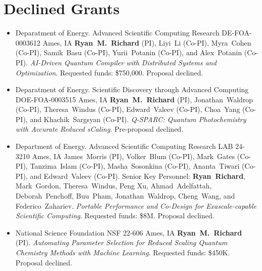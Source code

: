 \section{Declined Grants}
\begin{itemize}
	\item{
	      {Deparatment of Energy. Advanced Scientific Computing Research}
		  {DE-FOA-0003612}
		  {Ames, IA}
		  {}
		  {\textbf{Ryan~M.~Richard} (PI), Liyi~Li (Co-PI), Myra~Cohen (Co-PI), 
		   Samik~Basu (Co-PI), Yurii~Potanin (Co-PI), and Alex~Potanin (Co-PI).
		   \textit{AI-Driven Quantum Compiler with Distributed Systems and 
		           Optimization}.
		   Requested funds: \$750,000. Proposal declined.}
	}
	\item{
	      {Deparatment of Energy. Scientific Discovery through Advanced
		   Computing}
		  {DOE-FOA-0003515}
		  {Ames, IA}
		  {}
		  {\textbf{Ryan~M.~Richard} (PI), Jonathan~Waldrop (Co-PI),
		   Theresa~Windus (Co-PI), Edward~Valeev (Co-PI), Choa~Yang (Co-PI),
		   and Khachik~Sargsyan (Co-PI). 
		   \textit{Q-SPARC: Quantum Photochemistry with Accurate Reduced 
		           sCaling}. 
		   Pre-proposal declined.
		  } 
	}
	\item{
	      {Department of Energy. Advanced Scientific Computing Research}
		  {LAB 24-3210}
		  {Ames, IA}
		  {}
		  {James~Morris (PI), Volker~Blum (Co-PI), Mark~Gates (Co-PI), 
		   Tanzima~Islam (Co-PI), Masha~Sosonkina (Co-PI), 
		   Ananta~Tiwari (Co-PI), and Edward~Valeev (Co-PI). Senior Key 
		   Personnel: \textbf{Ryan~Richard}, Mark~Gordon, Theresa~Windus, 
		   Peng Xu, Ahmad~Adelfattah, Deborah~Penchoff, Buu~Pham, 
		   Jonathan~Waldrop, Cheng~Wang, and Federico~Zahariev.
		   \textit{Portable Performance and Co-Design for Exascale-capable
		           Scientific Computing}.
		   Requested funds: \$8M. Proposal declined. 
		   }
	}
	\item{
		  {National Science Foundation}
		  {NSF 22-606}
		  {Ames, IA}
		  {}
		  {\textbf{Ryan~M.~Richard} (PI).
		   \textit{Automating Parameter Selection for Reduced Scaling Quantum 
		           Chemistry Methods with Machine Learning}. 
		   Requested funds: \$450K. Proposal declined.
		  }

}
\end{itemize}
